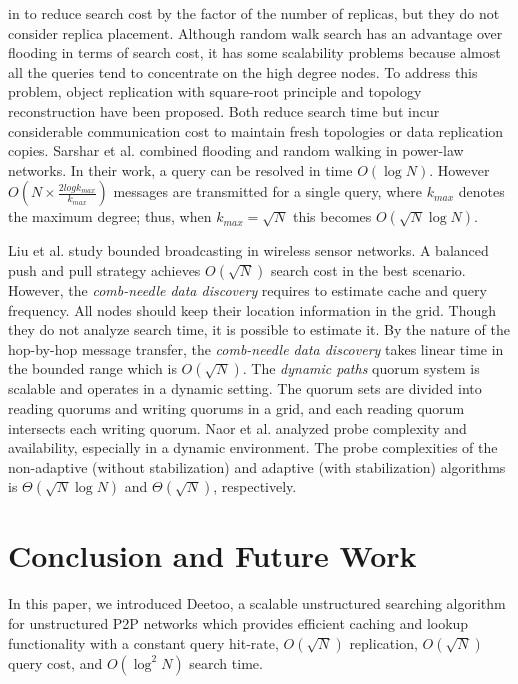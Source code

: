 \documentclass[conference]{IEEEtran}
\begin{document}
in \cite{alph:powerlaw01} to reduce search cost by the factor of 
the number of replicas, but they do not consider replica placement. 
Although random walk search has an advantage over flooding
in terms of search cost, it has some
scalability problems because almost all the queries tend to concentrate
on the high degree nodes. To address this problem, object
replication with square-root principle\cite{CohenS02,LCKS02}
and topology reconstruction\cite{Cooper05} have been proposed. 
Both reduce search time but incur considerable communication cost 
to maintain fresh topologies or data replication copies. 
Sarshar et al. \cite{ns:percolation}
combined flooding and random walking in power-law networks. In their
work, a query can be resolved in time $O(\log N)$. However
$O(N\times \frac{2log k_{max}}{k_{max}})$ messages are
transmitted for a single query, where $k_{max}$ denotes the maximum
degree; thus, when $k_{max} = \sqrt{N}$ this becomes $O(\sqrt N \log N)$.

Liu et al. \cite{LiuHZ04} study bounded broadcasting in wireless sensor networks. 
A balanced push and pull strategy achieves $O(\sqrt N)$ search 
cost in the best scenario. However, the \emph{comb-needle data discovery}  
requires to estimate cache and query frequency.
All nodes should keep their location information in the grid. 
Though they do not analyze search time, it is possible to estimate it. By the
nature of the hop-by-hop message transfer, the \emph{comb-needle data discovery} 
takes linear time in the bounded range which is $O(\sqrt N)$. 
The \emph{dynamic paths} quorum system\cite{Naor05} 
is scalable and operates in a dynamic setting. The quorum sets are 
divided into reading quorums and writing quorums in a grid, and each 
reading quorum intersects each writing quorum. Naor et al. analyzed probe 
complexity and availability, especially in a dynamic environment. 
The probe complexities of the non-adaptive (without stabilization)
and adaptive (with stabilization) algorithms is 
$\Theta(\sqrt N \log N)$ and $\Theta(\sqrt N)$, respectively. 



\section{Conclusion and Future Work}
\label{sec:conclusion}
In this paper, we introduced Deetoo, a scalable unstructured searching
algorithm for unstructured P2P networks which provides efficient caching
and lookup functionality with a constant query hit-rate, $O(\sqrt N)$
replication, $O(\sqrt{N})$ query cost, and $O(\log^2 N)$ search time.
\end{document}
